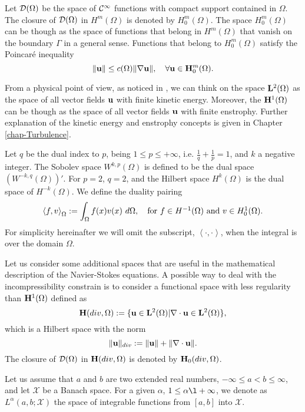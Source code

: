 Let $\mathcal{D}(\Omega)$ be the space of $\mathcal{C}^\infty$ functions with compact support contained in $\Omega$. The closure of $\mathcal{D}(\Omega)$ in $H^m(\Omega)$ is denoted by $H^m_0(\Omega)$. The space $H^m_0(\Omega)$ can be though as the space of functions that belong in $H^m(\Omega)$ that vanish on the boundary $\Gamma$ in a general sense. Functions that belong to $H^m_0(\Omega)$ satisfy the Poincaré inequality
\begin{equation}
\label{eq-Poincare_inequality}
\|{\bf u}\|\leq c(\Omega)\|\nabla{\bf u}\|,\quad\forall{\bf u}\in{\bf H}^m_0(\Omega).
\end{equation}

From a physical point of view, as noticed in \cite{Foias}, we can think on the space ${\bf L}^2(\Omega)$ as the space of all vector fields ${\bf u}$ with finite kinetic energy. Moreover, the ${\bf H}^1(\Omega)$ can be though as the space of all vector fields ${\bf u}$ with finite enstrophy. Further explanation of the kinetic energy and enstrophy concepts is given in Chapter \ref{chap-Turbulence}.

Let $ q $ be the dual index to $ p $, being $ 1\le p\le+\infty $, i.e. $ \frac{1}{q}+\frac{1}{p}=1 $, and $ k $ a negative integer. The Sobolev space $ W^{k,p}(\Omega) $ is defined to be the dual space $ \left(W^{-k,q}(\Omega)\right)' $. For $ p=2 $, $ q=2 $, and the Hilbert space $ H^k(\Omega) $ is the dual space of $ H^{-k}(\Omega) $. We define the duality pairing 
$$ \left\langle f,v\right\rangle_\Omega:=\int_{\Omega}f(x)v(x)\ d\Omega,\quad\mbox{for $ f\in H^{-1}(\Omega) $ and $ v\in H^1_0(\Omega) $}. $$
For simplicity hereinafter we will omit the subscript, $ \left\langle\cdot,\cdot\right\rangle $, when the integral is over the domain $ \Omega $.

Let us consider some additional spaces that are useful in the mathematical description of the Navier-Stokes equations. A possible way to deal with the incompressibility constrain  is to consider a functional space with less regularity than ${\bf H}^1(\Omega)$ defined as
$${\bf H}(div,\Omega):=\{{\bf u}\in{\bf L}^2(\Omega)|\nabla\cdot{\bf u}\in{\bf L}^2(\Omega)\},$$
which is a Hilbert space with the norm
$$\|{\bf u}\|_{div}:=\|{\bf u}\|+\|\nabla\cdot{\bf u}\|.$$
The closure of $\mathcal{D}(\Omega)$ in ${\bf H}(div,\Omega)$ is denoted by ${\bf H}_0(div,\Omega)$.

Let us assume that $ a $ and $ b $ are two extended real numbers, $ -\infty\le a < b\le\infty $, and let $ \mathcal{X} $ be a Banach space. For a given $ \alpha $, $ 1\le\alpha\l +\infty $, we denote as $ L^\alpha(a,b;\mathcal{X}) $ the space of integrable functions from $ \left[a,b\right] $ into $ \mathcal{X} $.